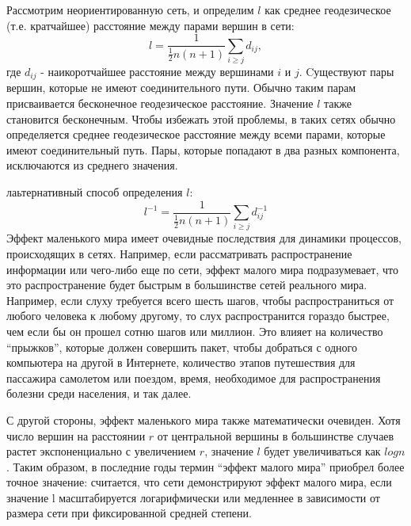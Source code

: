 \documentclass[a4paper]{article}
\begin{document}
Рассмотрим неориентированную сеть, и определим $l$ как среднее геодезическое (т.е. кратчайшее) расстояние между парами вершин в сети: $$ l = \frac{1}{\frac{1}{2}n(n+1)}\sum_{i \geq j}d_{ij},$$ где $d_{ij}$ - наикоротчайшее расстояние между вершинами $i$ и $j$.
Cуществуют пары вершин, которые не имеют соединительного пути. Обычно таким парам присваивается бесконечное геодезическое расстояние. Значение $l$ также становится бесконечным. Чтобы избежать этой проблемы, в таких сетях обычно определяется среднее геодезическое 
расстояние между всеми парами, которые имеют соединительный путь. Пары, которые попадают в два разных компонента, исключаются из среднего значения. 

лаьтернативный способ определения $l$: $$l^{-1} = \frac{1}{\frac{1}{2}n(n+1)}\sum_{i \geq j}d_{ij}^{-1}$$
Эффект маленького мира имеет очевидные последствия для динамики процессов, происходящих в сетях.
 Например, если рассматривать распространение информации или чего-либо еще по сети, эффект малого 
 мира подразумевает, что это распространение будет быстрым в большинстве сетей реального мира. 
 Например, если слуху требуется всего шесть шагов, чтобы распространиться от любого человека к 
 любому другому, то слух распространится гораздо быстрее, чем если бы он прошел сотню шагов или миллион. 
 Это влияет на количество “прыжков”, которые должен совершить пакет, чтобы добраться с одного компьютера
  на другой в Интернете, количество этапов путешествия для пассажира самолетом или поездом, время,
   необходимое для распространения болезни среди населения, и так далее. 

С другой стороны, эффект маленького мира также математически очевиден. Хотя число вершин на расстоянии $r$
от центральной вершины в большинстве случаев растет экспоненциально с увеличением $r$, значение $l$ будет увеличиваться как $logn$. Таким образом, в последние годы термин “эффект малого мира” приобрел 
более точное значение: считается, что сети демонстрируют эффект малого мира, если значение l 
   масштабируется логарифмически или медленнее в зависимости от размера сети при фиксированной средней 
   степени. 
   
   
\end{document}
